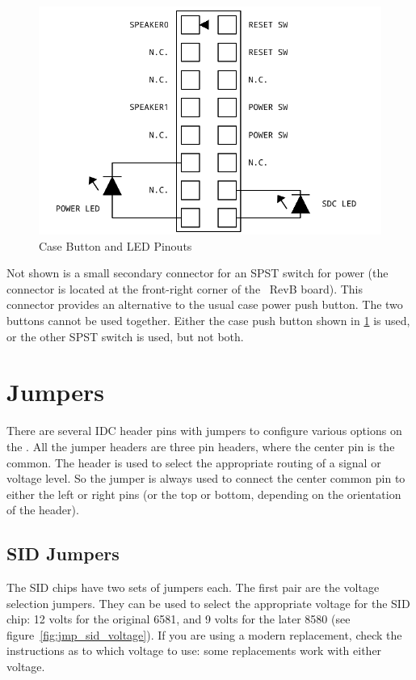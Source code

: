 \begin{figure}[ht]
    \begin{center}
        \includegraphics[scale=0.65]{images/f256_port_case.pdf}
    \end{center}
    \caption{Case Button and LED Pinouts}
    \label{fig:port_case}
\end{figure}

Not shown is a small secondary connector for an SPST switch for power (the connector is located at the front-right corner of the \fjr\ RevB board). This connector provides an alternative to the usual case power push button. The two buttons cannot be used together. Either the case push button shown in \ref{fig:port_case} is used, or the other SPST switch is used, but not both.

\section*{Jumpers}

There are several IDC header pins with jumpers to configure various options on the \jr. All the jumper headers are three pin headers, where the center pin is the common. The header is used to select the appropriate routing of a signal or voltage level. So the jumper is always used to connect the center common pin to either the left or right pins (or the top or bottom, depending on the orientation of the header).

\subsection*{SID Jumpers}

The SID chips have two sets of jumpers each. The first pair are the voltage selection jumpers. They can be used to select the appropriate voltage for the SID chip: 12 volts for the original 6581, and 9 volts for the later 8580 (see figure~\ref{fig:jmp_sid_voltage}). If you are using a modern replacement, check the instructions as to which voltage to use: some replacements work with either voltage.

